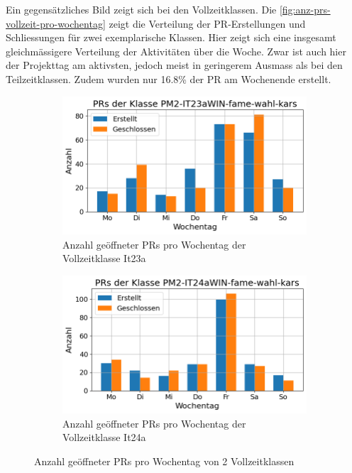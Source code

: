 Ein gegensätzliches Bild zeigt sich bei den Vollzeitklassen. Die \autoref{fig:anz-prs-vollzeit-pro-wochentag} zeigt die Verteilung der PR-Erstellungen und Schliessungen für zwei exemplarische Klassen.
Hier zeigt sich eine insgesamt gleichmässigere Verteilung der Aktivitäten über die Woche. Zwar ist auch hier der Projekttag am aktivsten, jedoch meist in geringerem Ausmass als bei den Teilzeitklassen. Zudem wurden nur 16.8\% der PR am Wochenende erstellt.

\begin{figure}[htbp]
    \centering
    \begin{subfigure}[b]{0.48\textwidth}
        \centering
        \includegraphics[width=\textwidth]{Figures/pr-klasse-per-wochentag-23a.png}
         \caption{Anzahl geöffneter PRs pro Wochentag der Vollzeitklasse It23a}
        \label{fig:anzahl-prs-pro-wochentag-it23a}
    \end{subfigure}
    \hfill
    \begin{subfigure}[b]{0.48\textwidth}
        \centering
        \includegraphics[width=\textwidth]{Figures/pr-klasse-per-wochentag-24a.png}
         \caption{Anzahl geöffneter PRs pro Wochentag der Vollzeitklasse It24a}
        \label{fig:anzahl-prs-pro-wochentag-it24a}
    \end{subfigure}
    \caption{Anzahl geöffneter PRs pro Wochentag von 2 Vollzeitklassen}
    \label{fig:anz-prs-vollzeit-pro-wochentag}
\end{figure}

